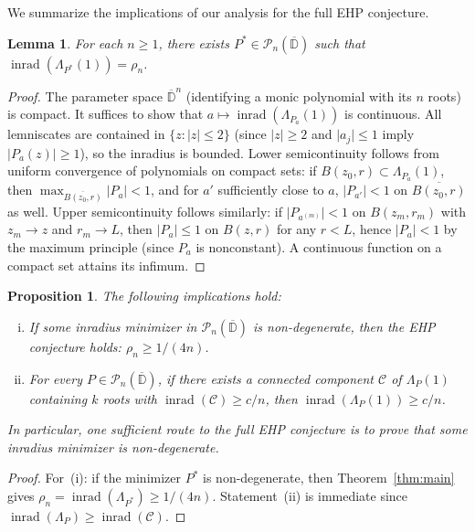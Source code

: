 \documentclass[11pt,a4paper]{amsart}
\newtheorem{lemma}[theorem]{Lemma}
\newtheorem{proposition}[theorem]{Proposition}
\theoremstyle{definition}
\newcommand{\D}{\mathbb{D}}
\newcommand{\Pn}{\mathcal{P}_n}
\newcommand{\abs}[1]{\lvert #1 \rvert}
\newcommand{\inrad}{\operatorname{inrad}}
\begin{document}
We summarize the implications of our analysis for the full EHP conjecture.

\begin{lemma}\label{lem:minimizer}
For each $n \geq 1$, there exists $P^* \in \Pn(\overline{\D})$ such that
$\inrad(\Lambda_{P^*}(1)) = \rho_n$.
\end{lemma}

\begin{proof}
The parameter space $\overline{\D}^n$ (identifying a monic polynomial
with its $n$ roots) is compact.  It suffices to show that
$a \mapsto \inrad(\Lambda_{P_a}(1))$ is continuous.
All lemniscates are contained in $\{z : \abs{z} \leq 2\}$
(since $\abs{z} \geq 2$ and $\abs{a_j} \leq 1$ imply
$\abs{P_a(z)} \geq 1$), so the inradius is bounded.
Lower semicontinuity follows from uniform convergence of polynomials
on compact sets: if $B(z_0,r) \subset \Lambda_{P_a}(1)$, then
$\max_{\overline{B(z_0,r)}}\abs{P_a} < 1$, and for $a'$ sufficiently
close to $a$, $\abs{P_{a'}} < 1$ on $\overline{B(z_0,r)}$ as well.
Upper semicontinuity follows similarly: if $\abs{P_{a^{(m)}}} < 1$
on $B(z_m, r_m)$ with $z_m \to z$ and $r_m \to L$, then
$\abs{P_a} \leq 1$ on $B(z,r)$ for any $r < L$, hence
$\abs{P_a} < 1$ by the maximum principle (since $P_a$ is nonconstant).
A continuous function on a compact set attains its infimum.
\end{proof}

\begin{proposition}\label{prop:reduction}
The following implications hold:
\begin{enumerate}[(i)]
  \item If some inradius minimizer in $\Pn(\overline{\D})$
    is non-degenerate, then the EHP conjecture holds:
    $\rho_n \geq 1/(4n)$.
  \item For every $P \in \Pn(\overline{\D})$, if there exists a
    connected component $\mathcal{C}$ of $\Lambda_P(1)$ containing
    $k$ roots with $\inrad(\mathcal{C}) \geq c/n$, then
    $\inrad(\Lambda_P(1)) \geq c/n$.
\end{enumerate}
In particular, one sufficient route to the full EHP conjecture is to
prove that some inradius minimizer is non-degenerate.
\end{proposition}

\begin{proof}
For~(i): if the minimizer $P^*$ is non-degenerate, then
Theorem~\ref{thm:main} gives
$\rho_n = \inrad(\Lambda_{P^*}) \geq 1/(4n)$.
Statement~(ii) is immediate since
$\inrad(\Lambda_P) \geq \inrad(\mathcal{C})$.
\end{proof}
\end{document}
